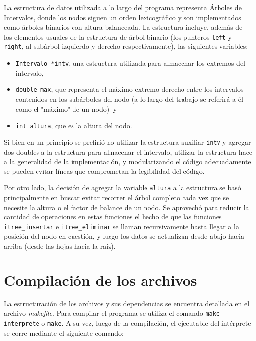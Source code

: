 \documentclass[11pt]{article}
\begin{document}
 La estructura de datos utilizada a lo largo del programa representa Árboles de Intervalos, donde los nodos siguen un orden lexicográfico y son implementados como árboles binarios con altura balanceada.
 La estructura incluye, además de los elementos usuales de la estructura de árbol binario (los punteros \verb|left| y \verb|right|, al subárbol izquierdo y derecho respectivamente), 
 las siguientes variables:
 \begin{itemize}
     \item \verb|Intervalo *intv|, una estructura utilizada para almacenar los extremos del intervalo,
     \item \verb|double max|, que representa el máximo extremo derecho entre los intervalos contenidos en los subárboles del nodo (a lo largo del trabajo se referirá a él como el "máximo" de un nodo), y
     \item \verb|int altura|, que es la altura del nodo.
 \end{itemize} \par
 
 Si bien en un principio se prefirió no utilizar la estructura auxiliar \verb|intv| y agregar dos doubles a la estructura para almacenar el intervalo, utilizar la estructura hace a la generalidad de la implementación, y modularizando el código adecuadamente se pueden evitar líneas que comprometan la legibilidad del código. \par

 Por otro lado, la decisión de agregar la variable \verb|altura| a la estructura se basó principalmente en buscar evitar recorrer el árbol completo cada vez que se necesite la altura o el factor de balance de un nodo. Se aprovechó para reducir la cantidad de operaciones en estas funciones el hecho de que las funciones \verb|itree_insertar| e \verb|itree_eliminar| se llaman recursivamente hasta llegar a la posición del nodo en cuestión, y luego los datos se actualizan desde abajo hacia arriba (desde las hojas hacia la raíz). \par
 
 
 \section{Compilación de los archivos}
 
 La estructuración de los archivos y sus dependencias se encuentra detallada en el archivo \textit{makefile}. 
 Para compilar el programa se utiliza el comando \verb|make interprete| o \verb|make|. A su vez, luego de la compilación, el ejecutable del intérprete se corre mediante el siguiente comando:\par
 
\end{document}
